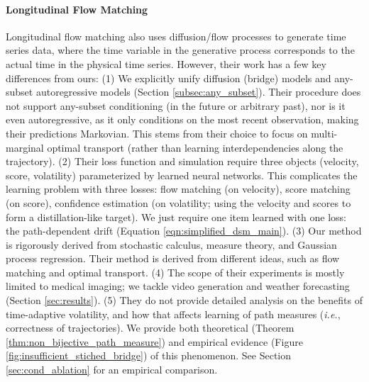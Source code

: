 \paragraph{Longitudinal Flow Matching}
Longitudinal flow matching \cite{islam2025longitudinal} also uses diffusion/flow processes to generate time series data, where the time variable in the generative process corresponds to the actual time in the physical time series. However, their work has a few key differences from ours:
(1) We explicitly unify diffusion (bridge) models and any-subset autoregressive models (Section \ref{subsec:any_subset}). Their procedure does not support any-subset conditioning (in the future or arbitrary past), nor is it even autoregressive, as it only conditions on the most recent observation, making their predictions Markovian.
This stems from their choice to focus on multi-marginal optimal transport (rather than learning interdependencies along the trajectory).
(2) Their loss function and simulation require three objects (velocity, score, volatility) parameterized by learned neural networks. This complicates the learning problem with three losses: flow matching (on velocity), score matching (on score), confidence estimation (on volatility; using the velocity and scores to form a distillation-like target). We just require one item learned with one loss: the path-dependent drift (Equation \ref{eqn:simplified_dsm_main}).
(3) Our method is rigorously derived from stochastic calculus, measure theory, and Gaussian process regression. Their method is derived from different ideas, such as flow matching and optimal transport.
(4) The scope of their experiments is mostly limited to medical imaging; we tackle video generation and weather forecasting (Section \ref{sec:results}).
(5) They do not provide detailed analysis on the benefits of time-adaptive volatility, and how that affects learning of path measures (\textit{i.e.}, correctness of trajectories). We provide both theoretical (Theorem \ref{thm:non_bijective_path_measure}) and empirical evidence (Figure \ref{fig:insufficient_stiched_bridge}) of this phenomenon. See Section \ref{sec:cond_ablation} for an empirical comparison.

